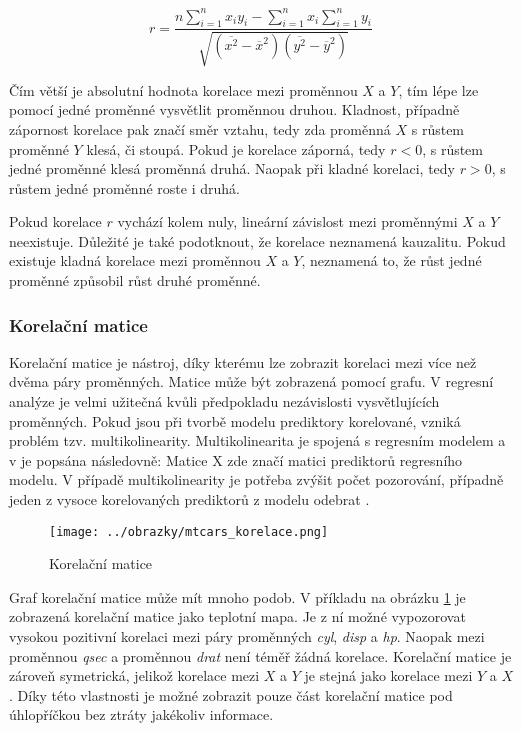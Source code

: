 \begin{equation}
r = \frac{n \sum_{i=1}^n x_i y_i - \sum_{i=1}^n x_i \sum_{i=1}^n y_i}
{\sqrt{(\overline{x^2} - \overline{x}^2)(\overline{y^2} - \overline{y}^2)}}
\end{equation}

Čím větší je absolutní hodnota korelace mezi proměnnou $X$ a $Y$, tím lépe lze pomocí jedné proměnné vysvětlit proměnnou druhou. Kladnost, případně zápornost korelace
pak značí směr vztahu, tedy zda proměnná $X$ s růstem proměnné $Y$ klesá, či stoupá. Pokud je korelace záporná, tedy $r < 0$, s růstem jedné proměnné klesá proměnná druhá.
Naopak při kladné korelaci, tedy $r > 0$, s růstem jedné proměnné roste i druhá.

Pokud korelace $r$ vychází kolem nuly, lineární závislost mezi proměnnými $X$ a $Y$ neexistuje. Důležité je také podotknout, že korelace neznamená kauzalitu. Pokud
existuje kladná korelace mezi proměnnou $X$ a $Y$, neznamená to, že růst jedné proměnné způsobil růst druhé proměnné.  


\subsubsection{Korelační matice}
Korelační matice je nástroj, díky kterému lze zobrazit korelaci mezi více než dvěma páry proměnných. Matice může být zobrazená pomocí grafu. V regresní analýze
je velmi užitečná kvůli předpokladu nezávislosti vysvětlujících proměnných. Pokud jsou při tvorbě modelu prediktory korelované,
vzniká problém tzv. multikolinearity. Multikolinearita je spojená s regresním modelem a v \cite{hebak_regrese_1998} je popsána následovně:
Matice X zde značí matici prediktorů regresního modelu. V případě multikolinearity je potřeba zvýšit počet pozorování, případně jeden z vysoce korelovaných prediktorů z modelu
odebrat \cite{kleinbaum_logistic_2010}.

\begin{figure}[H]
    \centering
    \texttt{[image: ../obrazky/mtcars\_korelace.png]}
    \caption{Korelační matice} 
    \label{fig:mtcars_korelace}
\end{figure}

Graf korelační matice může mít mnoho podob. V příkladu na obrázku \ref{fig:mtcars_korelace} je zobrazená korelační matice jako teplotní mapa. Je z ní možné vypozorovat vysokou
pozitivní korelaci mezi páry proměnných \textit{cyl}, \textit{disp} a \textit{hp}. Naopak mezi proměnnou \textit{qsec} a proměnnou \textit{drat} není téměř žádná korelace.
Korelační matice je zároveň symetrická, jelikož korelace mezi $X$ a $Y$ je stejná jako korelace mezi $Y$ a $X$. Díky této vlastnosti je možné zobrazit pouze část korelační matice
pod úhlopříčkou bez ztráty jakékoliv informace.

